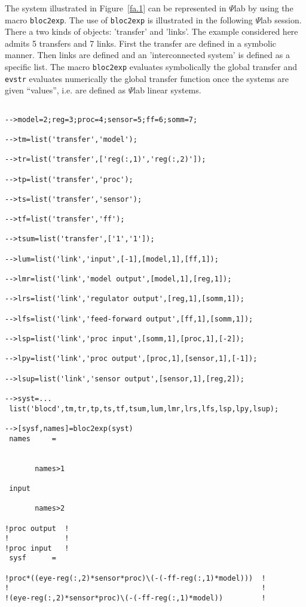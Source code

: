	The system illustrated in Figure~\ref{fa.1} can
be represented in $\Psi$lab by using the macro {\tt bloc2exp}.
The use of {\tt bloc2exp} is illustrated in the following $\Psi$lab
session.
There a two kinds of objects: 'transfer' and 'links'. The example
considered here admits 5 transfers and 7 links.
First the transfer are defined in a symbolic manner. Then links
are defined and an 'interconnected system' is defined as
a specific list. The macro {\tt bloc2exp} evaluates symbolically
the global transfer and {\tt evstr} evaluates numerically
the global transfer function once the systems are given ``values'', i.e.
are defined as $\Psi$lab linear systems.
%
\begin{verbatim}
 
-->model=2;reg=3;proc=4;sensor=5;ff=6;somm=7;
 
-->tm=list('transfer','model');
 
-->tr=list('transfer',['reg(:,1)','reg(:,2)']);
 
-->tp=list('transfer','proc');
 
-->ts=list('transfer','sensor');
 
-->tf=list('transfer','ff');
 
-->tsum=list('transfer',['1','1']);
 
-->lum=list('link','input',[-1],[model,1],[ff,1]);
 
-->lmr=list('link','model output',[model,1],[reg,1]);
 
-->lrs=list('link','regulator output',[reg,1],[somm,1]);
 
-->lfs=list('link','feed-forward output',[ff,1],[somm,1]);
 
-->lsp=list('link','proc input',[somm,1],[proc,1],[-2]);
 
-->lpy=list('link','proc output',[proc,1],[sensor,1],[-1]);
 
-->lsup=list('link','sensor output',[sensor,1],[reg,2]);
 
-->syst=...
 list('blocd',tm,tr,tp,ts,tf,tsum,lum,lmr,lrs,lfs,lsp,lpy,lsup);
 
-->[sysf,names]=bloc2exp(syst)
 names     =
 
 
       names>1
 
 input   
 
       names>2
 
!proc output  !
!             !
!proc input   !
 sysf      =
 
!proc*((eye-reg(:,2)*sensor*proc)\(-(-ff-reg(:,1)*model)))  !
!                                                           !
!(eye-reg(:,2)*sensor*proc)\(-(-ff-reg(:,1)*model))         !
\end{verbatim}
